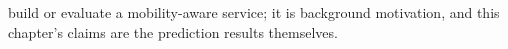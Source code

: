 build or evaluate a mobility-aware service; it is background motivation, and this chapter's claims are the
prediction results themselves.
